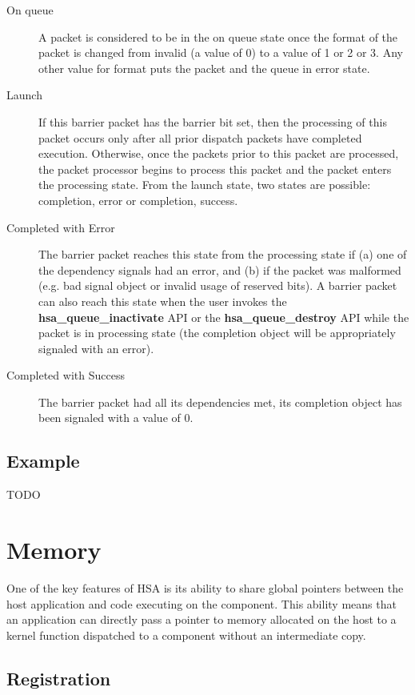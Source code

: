 \documentclass[final]{book}
\newcommand{\reffun}[1]{\textbf{#1}}
\begin{document}
\begin{description}
\item[On queue] A packet is considered to be in the on queue state once
  the format of the packet is changed from invalid (a value of 0) to a value of
  1 or 2 or 3. Any other value for format puts the packet and the queue in error
  state.
\item[Launch] If this barrier packet has the barrier bit set, then the
  processing of this packet occurs only after all prior dispatch packets have
  completed execution. Otherwise, once the packets prior to this packet are
  processed, the packet processor begins to process this packet and the packet
  enters the processing state. From the launch state, two states are possible:
  completion, error or completion, success.
\item[Completed with Error] The barrier packet reaches this state from the
  processing state if (a) one of the dependency signals had an error, and (b) if
  the packet was malformed (e.g. bad signal object or invalid usage of reserved
  bits). A barrier packet can also reach this state when the user invokes the
  \reffun{hsa_queue_inactivate} API or the \reffun{hsa_queue_destroy} API while
  the packet is in processing state (the completion object will be appropriately
  signaled with an error).
\item[Completed with Success] The barrier packet had all its dependencies met,
  its completion object has been signaled with a value of 0.
\end{description}

\hypertarget{aql-example}{}\subsection{Example}\label{aql-example}
TODO

\section{Memory}\label{memory}\hypertarget{memory}{}

One of the key features of HSA is its ability to share global pointers between
the host application and code executing on the component. This ability means
that an application can directly pass a pointer to memory allocated on the host
to a kernel function dispatched to a component without an intermediate copy.

\hypertarget{memory-registration}{}\subsection{Registration}\label{memory-registration}
\end{document}
